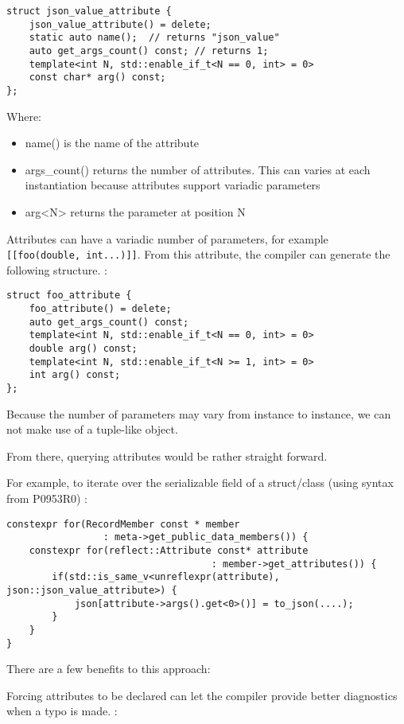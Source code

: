 \documentclass[a4paper,11pt]{article}
\begin{document}
\begin{lstlisting}
struct json_value_attribute {
    json_value_attribute() = delete;
    static auto name();  // returns "json_value"
    auto get_args_count() const; // returns 1;
    template<int N, std::enable_if_t<N == 0, int> = 0>
    const char* arg() const;
};
\end{lstlisting}

Where:
\begin{itemize}
\item
  name() is the name of the attribute
\item
  args\_count() returns the number of attributes. This can varies at
  each instantiation because attributes support variadic parameters
\item
  arg\textless{}N\textgreater{} returns the parameter at position N
\end{itemize}

Attributes can have a variadic number of parameters, for example
\texttt{{[}{[}foo(double,\ int...){]}{]}}. From this attribute, the
compiler can generate the following structure. :

\begin{lstlisting}
struct foo_attribute {
    foo_attribute() = delete;
    auto get_args_count() const;
    template<int N, std::enable_if_t<N == 0, int> = 0>
    double arg() const;
    template<int N, std::enable_if_t<N >= 1, int> = 0>
    int arg() const;
};
\end{lstlisting}

Because the number of parameters may vary from instance to instance, we
can not make use of a tuple-like object.

From there, querying attributes would be rather straight forward.

For example, to iterate over the serializable field of a struct/class
(using syntax from P0953R0) :

\begin{lstlisting}
constexpr for(RecordMember const * member 
                 : meta->get_public_data_members()) {
    constexpr for(reflect::Attribute const* attribute 
                                    : member->get_attributes()) {
        if(std::is_same_v<unreflexpr(attribute), json::json_value_attribute>) {
            json[attribute->args().get<0>()] = to_json(....);
        }
    }
}
\end{lstlisting}

There are a few benefits to this approach:

Forcing attributes to be declared can let the compiler provide better
diagnostics when a typo is made. :
\end{document}
